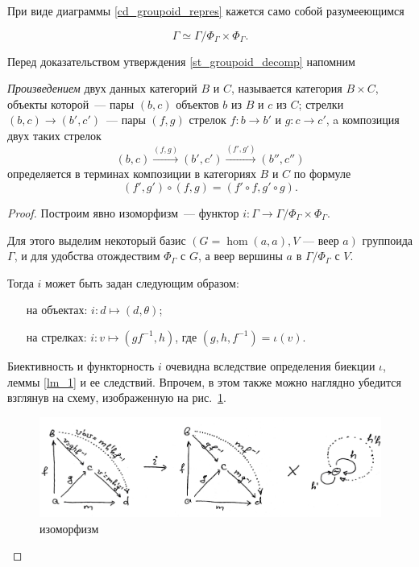     При виде диаграммы \ref{cd_groupoid_repres} кажется само собой разумееющимся
    \begin{statement}\label{st_groupoid_decomp}
        \begin{equation}
            \Gamma \simeq \textstyle{\Gamma / \Phi_\Gamma \times \Phi_\Gamma}.
        \end{equation}
    \end{statement}

    Перед доказательством утверждения \ref{st_groupoid_decomp} напомним
    \begin{definition}\cite{MacLane}
        \emph{Произведением} двух данных категорий $B$ и $C$, называется 
        категория $B \times C$, объекты которой~--- пары $(b,c)$ объектов $b$ из 
        $B$ и $c$ из $C$; стрелки $(b,c) \to (b',c')$~--- пары $(f,g)$ стрелок 
        $f : b \to b'$ и $g : c \to c'$, a композиция двух таких стрелок
        \[(b,c) \stackrel{(f,g)}{\longrightarrow} (b',c') \stackrel{(f',g')}{\longrightarrow} (b'',c'')\]
        определяется в терминах композиции в категориях $B$ и $C$ по формуле
        \[(f',g') \circ (f,g) = (f' \circ f, g' \circ g).\]
    \end{definition}

    \begin{proof}
    
        Построим явно изоморфизм~--- функтор $i : \Gamma \to 
        \Gamma / \Phi_\Gamma \times \Phi_\Gamma$.

        Для этого выделим некоторый базис $(G = \hom(a,a), V\text{~--- веер } a)$ 
        группоида $\Gamma$, и для удобства отождествим $\Phi_\Gamma$ с $G$, а 
        веер вершины $a$ в $\Gamma / \Phi_\Gamma$ с $V$.

        Тогда $i$ может быть задан следующим образом:
        \begin{itemize}
            \item [на объектах:] $i : d \mapsto (d,\theta)$;
            \item [на стрелках:] $i : v \mapsto (gf^{-1},h)$, где 
            $(g,h,f^{-1}) = \iota(v)$.
        \end{itemize}

        Биективность и функторность $i$ очевидна вследствие определения 
        биекции $\iota$, леммы \ref{lm_1} и ее следствий. Впрочем, в этом также 
        можно наглядно убедится взглянув на схему, 
        изображенную на рис.~\ref{cd_groupoid_iso}.

        \begin{figure}[h]
            \centering
            \includegraphics[width=\textwidth]{pictures/cd_grp_iso.pdf}
            \caption{изоморфизм}
            \label{cd_groupoid_iso}
        \end{figure}
    \end{proof}

